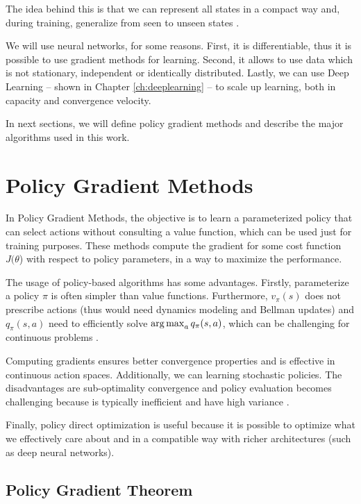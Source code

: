 The idea behind this is that we can represent all states in a compact way and, during training, generalize from seen to unseen states \cite{davidsilverlec6}. 

We will use neural networks, for some reasons. First, it is differentiable, thus it is possible to use gradient methods for learning. Second, it allows to use data which is not stationary, independent or identically distributed. Lastly, we can use Deep Learning -- shown in Chapter \ref{ch:deeplearning} -- to scale up learning, both in capacity and convergence velocity.

In next sections, we will define policy gradient methods and describe the major algorithms used in this work.


\section{Policy Gradient Methods}\label{sec:pgmethods}

In Policy Gradient Methods, the objective is to learn a parameterized policy that can select actions without consulting a value function, which can be used just for training purposes. These methods compute the gradient for some cost function $J(\theta$) with respect to policy parameters, in a way to maximize the performance.

The usage of policy-based algorithms has some advantages. Firstly, parameterize a policy $\pi$ is often simpler than value functions. Furthermore, $v_{\pi}(s)$ does not prescribe actions (thus would need dynamics modeling and Bellman updates) and $q_{\pi}(s,a)$ need to efficiently solve $\operatorname*{arg\,max}_{a} q_{\pi}(s,a)$, which can be challenging for continuous problems \cite{deeprlbootcamplec4}.

Computing gradients ensures better convergence properties and is effective in continuous action spaces. Additionally, we can learning stochastic policies. The disadvantages are sub-optimality convergence and policy evaluation becomes challenging because is typically inefficient and have high variance \cite{davidsilverlec7}.

Finally, policy direct optimization is useful because it is possible to optimize what we effectively care about and in a compatible way with richer architectures (such as deep neural networks).

\subsection{Policy Gradient Theorem}

